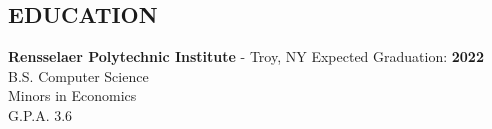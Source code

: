\documentclass{res}
\begin{document}
 


\address{\bf  ADDRESS\\11 Riverside Drive APT 7WE\\New York, NY 10023}
\address{\bf Contact Info \\ eli@elischiff.org \\   (646) 574-5224}
                                  
\begin{resume}


\section{EDUCATION}          
    {\bf Rensselaer Polytechnic Institute} - Troy, NY \hfill Expected Graduation: {\bf 2022} \\        
    B.S. Computer Science   \\    
    Minors in Economics  \\        
    G.P.A. 3.6          

 

\end{resume}
\end{document}
